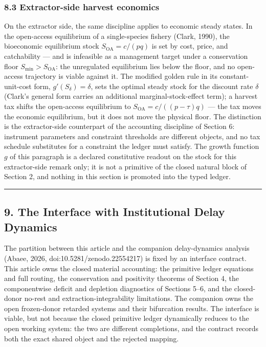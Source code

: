 \documentclass[11pt]{article}
\begin{document}
\subsubsection{8.3 Extractor-side harvest
economics}\label{extractor-side-harvest-economics}

On the extractor side, the same discipline applies to economic steady
states. In the open-access equilibrium of a single-species fishery
(Clark, 1990), the bioeconomic equilibrium stock
\(S_{\mathrm{OA}} = c/(pq)\) is set by cost, price, and catchability ---
and is infeasible as a management target under a conservation floor
\(S_{\min} > S_{\mathrm{OA}}\): the unregulated equilibrium lies below
the floor, and no open-access trajectory is viable against it. The
modified golden rule in its constant-unit-cost form,
\(g'(S_\delta) = \delta\), sets the optimal steady stock for the
discount rate \(\delta\) (Clark's general form carries an additional
marginal-stock-effect term); a harvest tax shifts the open-access
equilibrium to \(S_{\mathrm{OA}} = c/((p - \tau)q)\) --- the tax moves
the economic equilibrium, but it does not move the physical floor. The
distinction is the extractor-side counterpart of the accounting
discipline of Section 6: instrument parameters and constraint thresholds
are different objects, and no tax schedule substitutes for a constraint
the ledger must satisfy. The growth function \(g\) of this paragraph is
a declared constitutive readout on the stock for this extractor-side
remark only; it is not a primitive of the closed natural block of
Section 2, and nothing in this section is promoted into the typed
ledger.

\begin{center}\rule{0.5\linewidth}{0.5pt}\end{center}

\subsection{9. The Interface with Institutional Delay
Dynamics}\label{the-interface-with-institutional-delay-dynamics}

The partition between this article and the companion delay-dynamics analysis (Abaee, 2026, doi:10.5281/zenodo.22554217) is fixed by an interface contract. This article owns the closed material accounting: the
primitive ledger equations and full routing, the conservation and
positivity theorems of Section 4, the componentwise deficit and
depletion diagnostics of Sections 5--6, and the closed-donor no-rest and
extraction-integrability limitations. The companion owns the open
frozen-donor retarded systems and their bifurcation results. The
interface is viable, but not because the closed primitive ledger
dynamically reduces to the open working system: the two are different
completions, and the contract records both the exact shared object and
the rejected mapping.
\end{document}

